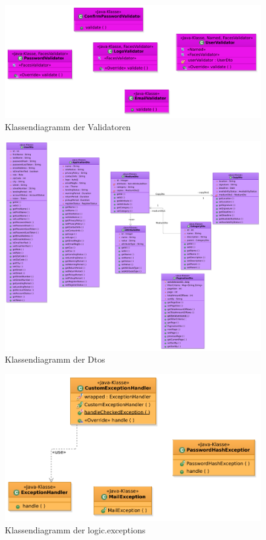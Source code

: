 \documentclass{article}
\begin{document}
\begin{figure}[H]
\hypertarget{Validator}{}
		\centering
		\includegraphics[width = 52em]{KlassendiagrammValidators}
		\caption{Klassendiagramm der Validatoren}
	\end{figure}


\begin{figure}[H]
		\centering
		\includegraphics[width = 52em]{Klassendiagramm-Dtoss_1}
		\caption{Klassendiagramm der Dtos}
	\end{figure}

\begin{figure}[H]
		\centering
		\includegraphics[width = 52em]{Klassendiagramm-ExceptionsObere}
		\caption{Klassendiagramm der logic.exceptions}
	\end{figure}
\end{document}
